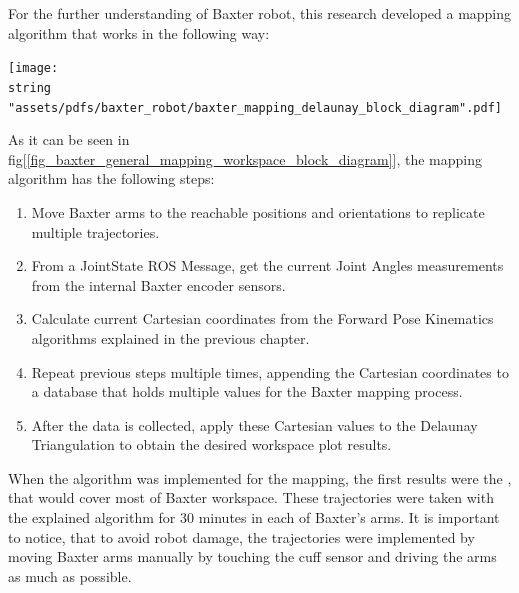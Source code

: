 \documentclass[11pt]{report} %
\begin{document}
For the further understanding of Baxter robot, this research developed a mapping algorithm that works in the following way:

\begin{center}
\texttt{[image: \\string "assets/pdfs/baxter\_robot/baxter\_mapping\_delaunay\_block\_diagram".pdf]}
\bigbreak
\begin{minipage}{\linewidth} %
\label{fig_baxter_general_mapping_workspace_block_diagram}
\end{minipage} \end{center}

As it can be seen in fig[\ref{fig_baxter_general_mapping_workspace_block_diagram}], the mapping algorithm has the following steps:

\begin{enumerate}
    \item Move Baxter arms to the reachable positions and orientations to replicate multiple trajectories.
    \item From a JointState ROS Message, get the current Joint Angles measurements from the internal Baxter encoder sensors.
    \item Calculate current Cartesian coordinates from the Forward Pose Kinematics algorithms explained in the previous chapter.
    \item Repeat previous steps multiple times, appending the Cartesian coordinates to a database that holds multiple values for the Baxter mapping process.
    \item After the data is collected, apply these Cartesian values to the Delaunay Triangulation to obtain the desired workspace plot results.
\end{enumerate}

When the algorithm was implemented for the mapping, the first results were the , that would cover most of Baxter workspace. These trajectories were taken with the explained algorithm for 30 minutes in each of Baxter's arms. It is important to notice, that to avoid robot damage, the trajectories were implemented by moving Baxter arms manually by touching the cuff sensor and driving the arms as much as possible.\\
\end{document}
